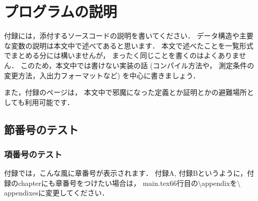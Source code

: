 \chapter{プログラムの説明}
\label{sec:appendix}
付録には，添付するソースコードの説明を書いてください．
データ構造や主要な変数の説明は本文中で述べてあると思います．
本文で述べたことを一覧形式でまとめる分には構いませんが，
まったく同じことを書くのはよくありません．
このため，本文中では書けない実装の話
(コンパイル方法や， 測定条件の変更方法，入出力フォーマットなど)
を中心に書きましょう．

また，付録のページは，
本文中で邪魔になった定義とか証明とかの避難場所としても利用可能です．

\section{節番号のテスト}
\subsection{項番号のテスト}
付録では，こんな風に章番号が表示されます．
付録A, 付録Bというように，付録のchapterにも章番号をつけたい場合は，
main.tex66行目の$\setminus$appendixを$\setminus$appendixesに変更してください．



